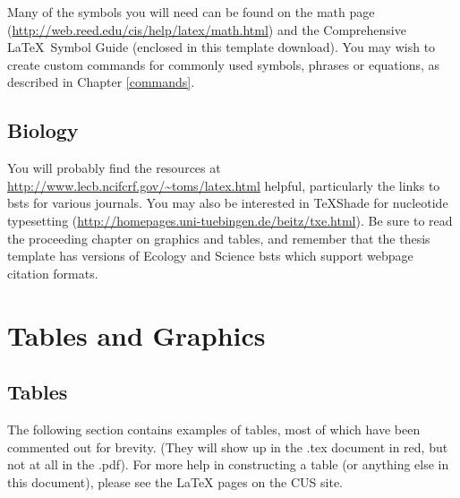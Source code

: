 \documentclass[12pt,twoside]{reedthesis}
\begin{document}
Many of the symbols you will need can be found on the math page (\url{http://web.reed.edu/cis/help/latex/math.html}) and the Comprehensive \LaTeX\ Symbol Guide (enclosed in this template download).  You may wish to create custom commands for commonly used symbols, phrases or equations, as described in Chapter \ref{commands}.

\section{Biology}
You will probably find the resources at \url{http://www.lecb.ncifcrf.gov/~toms/latex.html} helpful, particularly the links to bsts for various journals. You may also be interested in TeXShade for nucleotide typesetting (\url{http://homepages.uni-tuebingen.de/beitz/txe.html}).  Be sure to read the proceeding chapter on graphics and tables, and remember that the thesis template has versions of Ecology and Science bsts which support webpage citation formats. 

\chapter{Tables and Graphics}

\section{Tables}
The following section contains examples of tables, most of which have been commented out for brevity. (They will show up in the .tex document in red, but not at all in the .pdf). For more help in constructing a table (or anything else in this document), please see the LaTeX pages on the CUS site.
\end{document}
